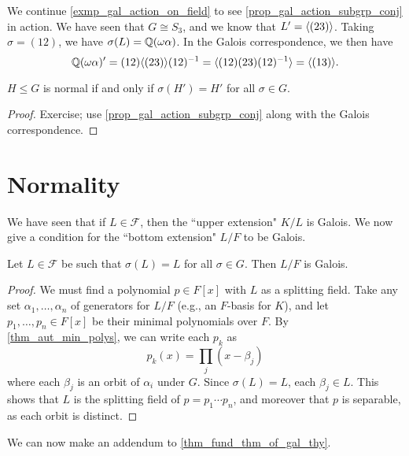 \begin{example}
    We continue \cref{exmp_gal_action_on_field} to see \cref{prop_gal_action_subgrp_conj} in action. We have seen that $G \cong S_3$, and we know that $L' = \langle {(23)} \rangle$. Taking $\sigma = (12)$, we have $\sigma(L) = \mathbb{{Q}}(\omega \alpha)$. In the Galois correspondence, we then have
    \[
        \mathbb{{Q}}(\omega \alpha)' = (12) \langle {(23)} \rangle (12)^{-1} = \langle {(12)(23)(12)^{-1}} \rangle = \langle {(13)} \rangle.
    \]
\end{example}

\begin{corollary}
\label{cor_normal_subgrp_of_gal_grp_iff}
    $H \leq G$ is normal if and only if $\sigma(H') = H'$ for all $\sigma \in G$.
\end{corollary}

\begin{proof}
    Exercise; use \cref{prop_gal_action_subgrp_conj} along with the Galois correspondence.
\end{proof}

\section{Normality}

We have seen that if $L \in \mathcal{F}$, then the ``upper extension" $K/L$ is Galois. We now give a condition for the ``bottom extension" $L/F$ to be Galois.

\begin{lemma}
\label{lem_cond_for_bottom_ext_gal}
    Let $L \in \mathcal{F}$ be such that $\sigma(L) = L$ for all $\sigma \in G$. Then $L/F$ is Galois.
\end{lemma}

\begin{proof}
    We must find a polynomial $p \in F[x]$ with $L$ as a splitting field. Take any set $\alpha_1, \ldots, \alpha_n$ of generators for $L/F$ (e.g., an $F$-basis for $K$), and let $p_1, \ldots, p_n \in F[x]$ be their minimal polynomials over $F$. By \cref{thm_aut_min_polys}, we can write each $p_k$ as
    \[
        p_k(x) = \prod_{j} (x - \beta_j)
    \]
    where each $\beta_j$ is an orbit of $\alpha_i$ under $G$. Since $\sigma(L) = L$, each $\beta_j \in L$. This shows that $L$ is the splitting field of $p = p_1 \cdots p_n$, and moreover that $p$ is separable, as each orbit is distinct.
\end{proof}

We can now make an addendum to \cref{thm_fund_thm_of_gal_thy}.

